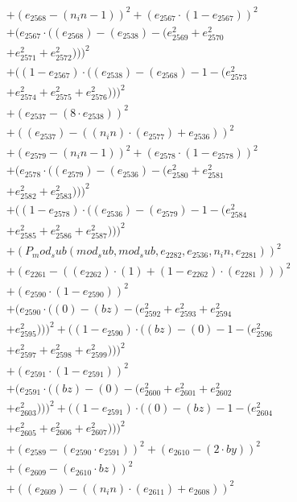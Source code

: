 \documentclass[10pt, a4paper]{article}
\begin{document}
\begin{small}
\begin{align*}
& + (e_{2568} - (n_in - 1))^{2} + (e_{2567}  \cdot  (1 - e_{2567}))^{2} \\
& + (e_{2567}  \cdot  ((e_{2568}) - (e_{2538}) - (e_{2569}^{2} + e_{2570}^{2} \\
& + e_{2571}^{2} + e_{2572}^{2})))^{2} \\
& + ((1 - e_{2567})  \cdot  ((e_{2538}) - (e_{2568}) - 1 - (e_{2573}^{2} \\
& + e_{2574}^{2} + e_{2575}^{2} + e_{2576}^{2})))^{2} \\
& + (e_{2537} - (8  \cdot  e_{2538}))^{2} \\
& + ((e_{2537}) - ((n_in)  \cdot  (e_{2577}) + e_{2536}))^{2} \\
& + (e_{2579} - (n_in - 1))^{2} + (e_{2578}  \cdot  (1 - e_{2578}))^{2} \\
& + (e_{2578}  \cdot  ((e_{2579}) - (e_{2536}) - (e_{2580}^{2} + e_{2581}^{2} \\
& + e_{2582}^{2} + e_{2583}^{2})))^{2} \\
& + ((1 - e_{2578})  \cdot  ((e_{2536}) - (e_{2579}) - 1 - (e_{2584}^{2} \\
& + e_{2585}^{2} + e_{2586}^{2} + e_{2587}^{2})))^{2} \\
& + (P_mod_sub(mod_sub, mod_sub, e_{2282}, e_{2536}, n_in, e_{2281}))^{2} \\
& + (e_{2261} - ((e_{2262})  \cdot  (1) + (1 - e_{2262})  \cdot  (e_{2281})))^{2} \\
& + (e_{2590}  \cdot  (1 - e_{2590}))^{2} \\
& + (e_{2590}  \cdot  ((0) - (bz) - (e_{2592}^{2} + e_{2593}^{2} + e_{2594}^{2} \\
& + e_{2595}^{2})))^{2} + ((1 - e_{2590})  \cdot  ((bz) - (0) - 1 - (e_{2596}^{2} \\
& + e_{2597}^{2} + e_{2598}^{2} + e_{2599}^{2})))^{2} \\
& + (e_{2591}  \cdot  (1 - e_{2591}))^{2} \\
& + (e_{2591}  \cdot  ((bz) - (0) - (e_{2600}^{2} + e_{2601}^{2} + e_{2602}^{2} \\
& + e_{2603}^{2})))^{2} + ((1 - e_{2591})  \cdot  ((0) - (bz) - 1 - (e_{2604}^{2} \\
& + e_{2605}^{2} + e_{2606}^{2} + e_{2607}^{2})))^{2} \\
& + (e_{2589} - (e_{2590}  \cdot  e_{2591}))^{2} + (e_{2610} - (2  \cdot  by))^{2} \\
& + (e_{2609} - (e_{2610}  \cdot  bz))^{2} \\
& + ((e_{2609}) - ((n_in)  \cdot  (e_{2611}) + e_{2608}))^{2} \\

\end{align*}
\end{small}
\end{document}
